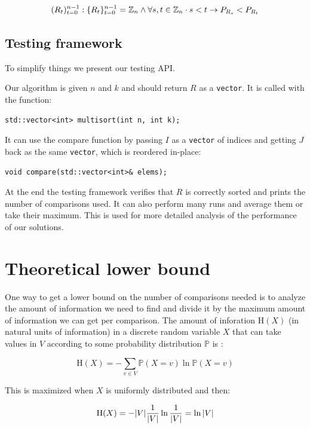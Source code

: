 \documentclass{article}
\DeclarePairedDelimiter{\set}{\{}{\}}
\DeclarePairedDelimiter{\abs}{\lvert}{\rvert}
\begin{document}
$$ (R_t)_{t=0}^{n - 1}  : \set{R_t}_{t=0}^{n - 1} = \mathbb{Z}_n \land \forall s,t \in \mathbb{Z}_n \cdot s < t \rightarrow P_{R_s} < P_{R_t} $$

\subsection{Testing framework}

To simplify things we present our testing API.

Our algorithm is given $ n $ and $ k $ and should return $ R $ as a \verb|vector|. It is called with the function:

\begin{lstlisting}
std::vector<int> multisort(int n, int k);
\end{lstlisting}

It can use the compare function by passing $ I $ as a \verb|vector| of indices and getting $ J $ back as the same \verb|vector|, which is reordered in-place:

\begin{lstlisting}
void compare(std::vector<int>& elems);
\end{lstlisting}

At the end the testing framework verifies that $ R $ is correctly sorted and prints the number of comparisons used. It can also perform many runs and average them or take their maximum. This is used for more detailed analysis of the performance of our solutions.

\section{Theoretical lower bound}

One way to get a lower bound on the number of comparisons needed is to analyze the amount of information we need to find and divide it by the maximum amount of information we can get per comparison. The amount of inforation $ \mathrm{H}(X) $ (in natural units of information) in a discrete random variable $ X $ that can take values in $ V $ according to some probability distribution $ \mathbb{P} $ is \cite{informationtheory}:

$$ \mathrm{H}(X) = - \sum_{v \in V} \mathbb{P}(X = v) \ln{\mathbb{P}(X = v)} $$

This is maximized when $ X $ is uniformly distributed \cite{informationtheory} and then:

$$ \mathrm{H}(X) = - \abs{V} \frac{1}{\abs{V}} \ln{\frac{1}{\abs{V}}} = \ln{\abs{V}} $$
\end{document}
